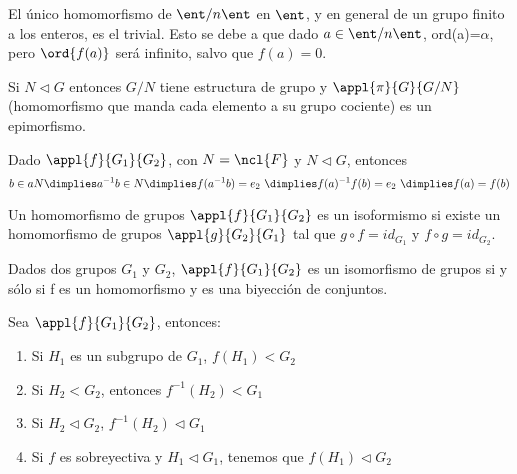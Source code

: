 \documentclass[nochap]{apuntes}
\begin{document}
\begin{remark}El único homomorfismo de $\ent/n\ent$  en $\ent$, y en general de un grupo finito a los enteros, es el trivial. Esto se debe
a que dado $a\in\ent/n\ent$, ord(a)=$\alpha$, pero $\ord{f(a)}$ será infinito, salvo que $f(a)=0$.\end{remark}

\begin{lemma} Si $N\lhd G$ entonces $G/N$ tiene estructura de grupo y $\appl{\pi}{G}{G/N}$  (homomorfismo que manda cada
elemento a su grupo cociente)  es un epimorfismo.
\end{lemma}

\begin{lemma} Dado $\appl{f}{G_1}{G_2}$, con $N=\ncl{F}$ y $N \lhd G$, entonces
\[ b\in aN \dimplies  a^{-1}b\in N \dimplies f(a^{-1}b)=e_2 \ \dimplies f(a)^{-1}f(b)=e_2 \ \dimplies f(a)=f(b) \]
\end{lemma}

\begin{defn}[Isomorfismo]
Un homomorfismo de grupos $\appl{f}{G_1}{G_2}$ es un isoformismo si existe un homomorfismo de grupos $\appl{g}{G_2}{G_1}$ tal que $g\circ f = id_{G_1}$ y $f\circ g = id_{G_2}$.
\end{defn}

\begin{remark} Dados dos grupos $G_1$ y $G_2$, $\appl{f}{G_1}{G_2}$ es un isomorfismo de grupos si y sólo si f es un homomorfismo y es una biyección de conjuntos.
\end{remark}

\begin{lemma}\label{lemPropsHF}
Sea $\appl{f}{G_1}{G_2}$, entonces:
\begin{enumerate}
\item Si $H_1$ es un subgrupo de $G_1$, $f(H_1)<G_2$
\item Si $H_2 < G_2$, entonces $f^{-1}(H_2)<G_1$
\item Si $H_2 \lhd G_2$, $f^{-1}(H_2)\lhd G_1$
\item Si $f$ es sobreyectiva y $H_1\lhd G_1$, tenemos que $f(H_1)\lhd G_2$
\end{enumerate}
\end{lemma}
\end{document}
